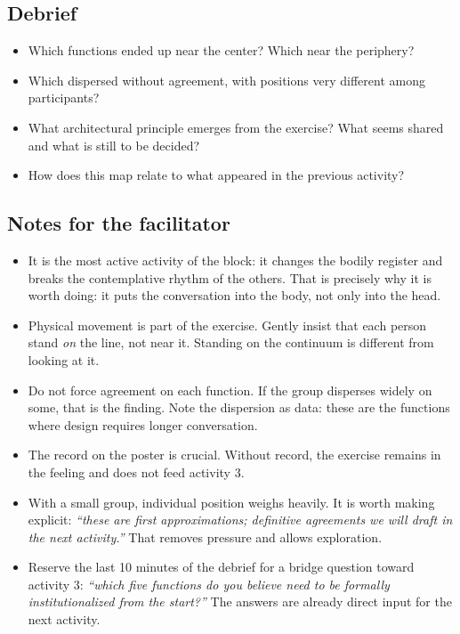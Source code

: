\documentclass[11pt, a4paper]{article}
\begin{document}
\begin{actividad}
\subsection*{Debrief}
\begin{itemize}
  \item Which functions ended up near the center? Which near the periphery?
  \item Which dispersed without agreement, with positions very different among participants?
  \item What architectural principle emerges from the exercise? What seems shared and what is still to be decided?
  \item How does this map relate to what appeared in the previous activity?
\end{itemize}

\subsection*{Notes for the facilitator}
\begin{itemize}
  \item It is the most active activity of the block: it changes the bodily register and breaks the contemplative rhythm of the others. That is precisely why it is worth doing: it puts the conversation into the body, not only into the head.
  \item Physical movement is part of the exercise. Gently insist that each person stand \emph{on} the line, not near it. Standing on the continuum is different from looking at it.
  \item Do not force agreement on each function. If the group disperses widely on some, that is the finding. Note the dispersion as data: these are the functions where design requires longer conversation.
  \item The record on the poster is crucial. Without record, the exercise remains in the feeling and does not feed activity 3.
  \item With a small group, individual position weighs heavily. It is worth making explicit: \emph{``these are first approximations; definitive agreements we will draft in the next activity.''} That removes pressure and allows exploration.
  \item Reserve the last 10 minutes of the debrief for a bridge question toward activity 3: \emph{``which five functions do you believe need to be formally institutionalized from the start?''} The answers are already direct input for the next activity.
\end{itemize}

\end{actividad}
\end{document}
